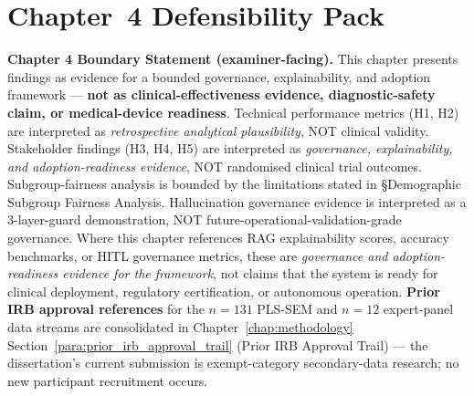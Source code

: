 \section*{Chapter~4 Defensibility Pack}
\label{sec:ch4_defensibility_pack}

\noindent\textbf{Chapter 4 Boundary Statement (examiner-facing).}
\label{para:ch4_boundary_statement}
This chapter presents findings as evidence for a bounded governance, explainability, and adoption framework --- \textbf{not as clinical-effectiveness evidence, diagnostic-safety claim, or medical-device readiness}. Technical performance metrics (H1, H2) are interpreted as \emph{retrospective analytical plausibility}, NOT clinical validity. Stakeholder findings (H3, H4, H5) are interpreted as \emph{governance, explainability, and adoption-readiness evidence}, NOT randomised clinical trial outcomes. Subgroup-fairness analysis is bounded by the limitations stated in §Demographic Subgroup Fairness Analysis. Hallucination governance evidence is interpreted as a 3-layer-guard demonstration, NOT future-operational-validation-grade governance. Where this chapter references RAG explainability scores, accuracy benchmarks, or HITL governance metrics, these are \emph{governance and adoption-readiness evidence for the framework}, not claims that the system is ready for clinical deployment, regulatory certification, or autonomous operation. \textbf{Prior IRB approval references} for the $n{=}131$ PLS-SEM and $n{=}12$ expert-panel data streams are consolidated in Chapter~\ref{chap:methodology} Section~\ref{para:prior_irb_approval_trail} (Prior IRB Approval Trail) --- the dissertation's current submission is exempt-category secondary-data research; no new participant recruitment occurs.

